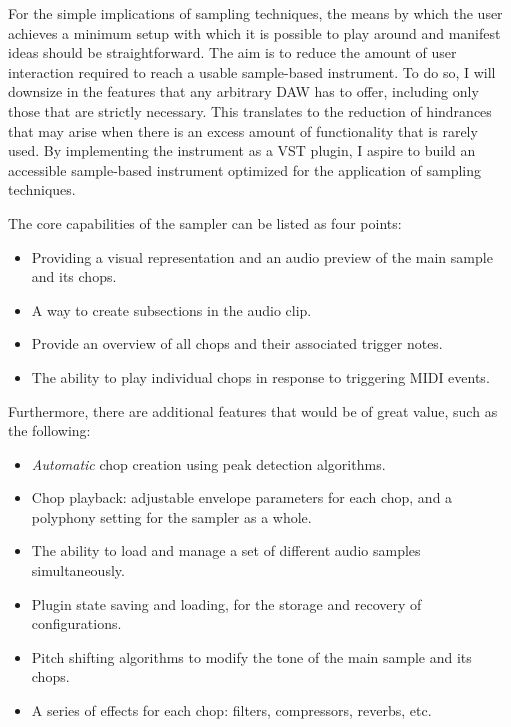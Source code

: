 \documentclass[12pt, a4paper, hidelinks]{report}
\begin{document}
	For the simple implications of sampling techniques, the means by which the user achieves a minimum setup with which it is possible to play around and manifest ideas should be straightforward. The aim is to reduce the amount of user interaction required to reach a usable sample-based instrument. To do so, I will downsize in the features that any arbitrary DAW has to offer, including only those that are strictly necessary. This translates to the reduction of hindrances that may arise when there is an excess amount of functionality that is rarely used.  By implementing the instrument as a VST plugin, I aspire to build an accessible sample-based instrument optimized for the application  of sampling techniques. %
	\par
	The core capabilities of the sampler can be listed as four points:
	\begin{itemize}
		\item Providing a visual representation and an audio preview of the main 
		sample and its chops.
		\item A way to create subsections in the audio clip.
		\item Provide an overview of all chops and their associated trigger notes.
		\item The ability to play individual chops in response to triggering MIDI events.
	\end{itemize}
	
	Furthermore, there are additional features that would be of great value, such as the following:
	\begin{itemize}
		\item \textit{Automatic} chop creation using peak detection algorithms.
		\item Chop playback: adjustable envelope parameters for each chop, and a polyphony setting for the sampler as a whole.
		\item The ability to load and manage a set of different audio samples simultaneously.
		\item Plugin state saving and loading, for the storage and recovery of configurations.
		\item Pitch shifting algorithms to modify the tone of the main sample and its chops.
		\item A series of effects for each chop: filters, compressors, reverbs, etc.
	\end{itemize}
	
\end{document}
